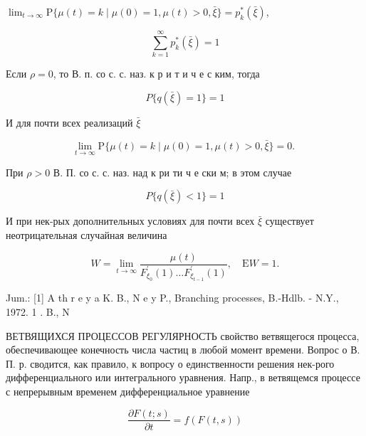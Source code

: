 \documentclass[10pt]{article}
\begin{document}
$\lim _{t \rightarrow \infty} \mathrm{P}\{\mu(t)=k \mid \mu(0)=1, \mu(t)>0, \bar{\xi}\}=p_{k}^{*}(\bar{\xi})$,



\[

\sum_{k=1}^{\infty} p_{k}^{*}(\bar{\xi})=1

\]



Если $\rho=0$, то В. п. со с. с. наз. к р и т и ч е с ким, тогда



\[

P\{q(\bar{\xi})=1\}=1

\]



И для почти всех реализаций $\bar{\xi}$



\[

\lim _{t \rightarrow \infty} \mathrm{P}\{\mu(t)=k \mid \mu(0)=1, \mu(t)>0, \bar{\xi}\}=0 \text {. }

\]



При $\rho>0$ В. П. со с. с. наз. над к ри ти ч е ски м; в этом случае



\[

P\{q(\bar{\xi})<1\}=1

\]



И при нек-рых дополнительных условиях для почти всех $\bar{\xi}$ существует неотрицательная случайная величина



\[

W=\lim _{t \rightarrow \infty} \frac{\mu(t)}{F_{\xi_{0}}^{\prime}(1) \ldots F_{\xi_{t-1}}^{\prime}(1)}, \quad \mathrm{E} W=1 .

\]



Jum.: [1] A th r e y a K. B., N e y P., Branching processes, B.-Hdlb. - N.Y., 1972. 1 . B., N



ВЕТВЯЩИХСЯ ПРОЦЕССОВ РЕГУЛЯРНОСТЬ свойство ветвящегося процесса, обеспечивающее конечность числа частиц в любой момент времени. Вопрос о В. П. р. сводится, как правило, к вопросу о единственности решения нек-рого дифференциального или интегрального уравнения. Напр., в ветвящемся процессе с непрерывным временем дифференциальное уравнение



\[

\frac{\partial F(t ; s)}{\partial t}=f(F(t, s))

\]
\end{document}

